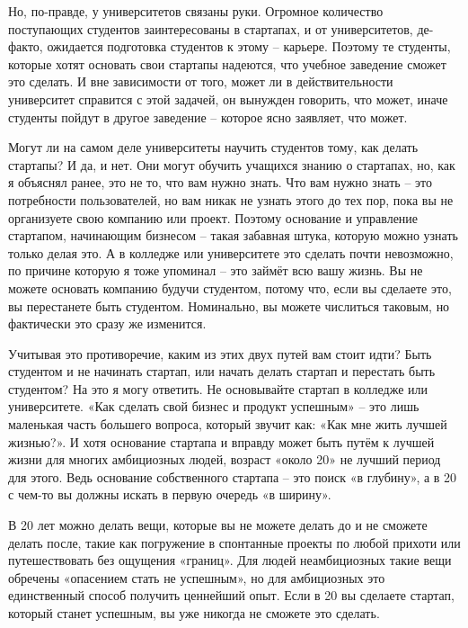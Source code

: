 \documentclass[ebook,12pt,oneside,openany]{memoir}
\begin{document}
Но, по-правде, у университетов связаны руки. Огромное количество
поступающих студентов заинтересованы в стартапах, и от университетов,
де-факто, ожидается подготовка студентов к этому – карьере. Поэтому те
студенты, которые хотят основать свои стартапы надеются, что учебное
заведение сможет это сделать. И вне зависимости от того, может ли в
действительности университет справится с этой задачей, он вынужден
говорить, что может, иначе студенты пойдут в другое заведение –
которое ясно заявляет, что может. \newline

Могут ли на самом деле университеты научить студентов тому, как делать
стартапы? И да, и нет. Они могут обучить учащихся знанию о стартапах,
но, как я объяснял ранее, это не то, что вам нужно знать. Что вам
нужно знать – это потребности пользователей, но вам никак не узнать
этого до тех пор, пока вы не организуете свою компанию или проект.
Поэтому основание и управление стартапом, начинающим бизнесом – такая
забавная штука, которую можно узнать только делая это. А в колледже
или университете это сделать почти невозможно, по причине которую я
тоже упоминал – это займёт всю вашу жизнь. Вы не можете основать
компанию будучи студентом, потому что, если вы сделаете это, вы
перестанете быть студентом. Номинально, вы можете числиться таковым,
но фактически это сразу же изменится. \newline

Учитывая это противоречие, каким из этих двух путей вам стоит идти?
Быть студентом и не начинать стартап, или начать делать стартап и
перестать быть студентом? На это я могу ответить. Не основывайте
стартап в колледже или университете. «Как сделать свой бизнес и
продукт успешным» – это лишь маленькая часть большего вопроса, который
звучит как: «Как мне жить лучшей жизнью?». И хотя основание стартапа и
вправду может быть путём к лучшей жизни для многих амбициозных людей,
возраст «около 20» не лучший период для этого. Ведь основание
собственного стартапа – это поиск «в глубину», а в 20 с чем-то вы
должны искать в первую очередь «в ширину». \newline

В 20 лет можно делать вещи, которые вы не можете делать до и не
сможете делать после, такие как погружение в спонтанные проекты по
любой прихоти или путешествовать без ощущения «границ». Для людей
неамбициозных такие вещи обречены «опасением стать не успешным», но
для амбициозных это единственный способ получить ценнейший опыт. Если
в 20 вы сделаете стартап, который станет успешным, вы уже никогда не
сможете это сделать. \newline
\end{document}
